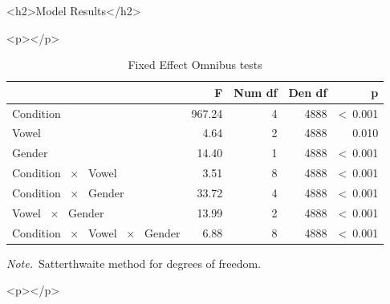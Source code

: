 \documentclass[a4paper,man,hidelinks,floatsintext]{apa7}
\begin{document}
    <h2>Model Results</h2>
      
        <p></p>
      
    
\begin{table}[!htbp]
\caption{Fixed Effect Omnibus tests}
\label{tab:Table_2}
\begin{adjustbox}{max size={\columnwidth}{\textheight}}
\centering
\begin{tabular}{lrrrr}
\hline
~                                            &      F & Num df & Den df &               p \\
\hline
Condition                                    & 967.24 &      4 &   4888 & \textless~0.001 \\
Vowel                                        &   4.64 &      2 &   4888 &           0.010 \\
Gender                                       &  14.40 &      1 &   4888 & \textless~0.001 \\
Condition ~$\times$~ Vowel                   &   3.51 &      8 &   4888 & \textless~0.001 \\
Condition ~$\times$~ Gender                  &  33.72 &      4 &   4888 & \textless~0.001 \\
Vowel ~$\times$~ Gender                      &  13.99 &      2 &   4888 & \textless~0.001 \\
Condition ~$\times$~ Vowel ~$\times$~ Gender &   6.88 &      8 &   4888 & \textless~0.001 \\
\hline
\end{tabular}
\end{adjustbox}
\begin{tablenotes} {
\small
\textit{Note.}~Satterthwaite method for degrees of freedom. \\
}
\end{tablenotes}
\end{table}
      
        <p></p>
      
\end{document}
